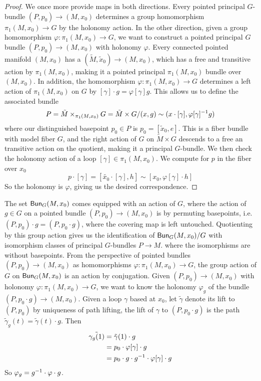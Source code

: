 %
\begin{proof}
 We once more provide maps in both directions. Every pointed principal $G$-bundle
 $(P,p_0) \to (M, x_0)$ determines a group homomorphism $\pi_1(M,x_0) \to G$
 by the holonomy action. In the other direction, given a group homomorphism
 $\varphi : \pi_1(M, x_0) \to G$, we want to construct a pointed principal $G$
 bundle $(P, p_0) \to (M, x_0)$ with holonomy $\varphi$. Every connected pointed manifold
 $(M, x_0)$ has a  $(\tilde{M}, \tilde{x}_0) \to (M,x_0)$,
 which has a free and transitive action by $\pi_1(M,x_0)$, making it a pointed
 principal $\pi_1(M,x_0)$ bundle over $(M,x_0)$. In addition, the homomorphism
 $\varphi : \pi_1(M, x_0) \to G$ determines a left action of $\pi_1(M,x_0)$
 on $G$ by $[\gamma] \cdot g = \varphi[\gamma] g$. This allows us to define
 the associated bundle
 \[
  P = \tilde{M} \times_{\pi_1(M, x_0)} G = \tilde{M} \times G
  / (x,g) \sim (x \cdot [\gamma], \varphi[\gamma]^{-1} g)
 \]
 where our distinguished basepoint $p_0 \in P$ is $p_0 = [\tilde{x}_0, e]$.
 This is a fiber bundle with model fiber $G$, and the right action of $G$
 on $\tilde{M} \times G$ descends to a free an transitive action on the quotient,
 making it a principal $G$-bundle. We then check the holonomy action of a
 loop $[\gamma] \in \pi_1(M, x_0)$. We compute for $p$ in the fiber over $x_0$
 \[
  p \cdot [\gamma] = [\tilde{x_0} \cdot [\gamma], h] \sim [x_0, \varphi[\gamma]\cdot h]
 \]
 So the holonomy is $\varphi$, giving us the desired correspondence.
\end{proof}
%
The set $\mathsf{Bun}_G(M, x_0)$ comes equipped with an action of $G$, where the action
of $g \in G$ on a pointed bundle $(P, p_0) \to (M, x_0)$  is by permuting basepoints,
i.e. $(P, p_0) \cdot g = (P, p_0 \cdot g)$, where the covering map is left untouched.
Quotienting by this group action gives us the identification of $\mathsf{Bun}_G(M,x_0) / G$
with isomorphism classes of principal $G$-bundles $P \to M$. where the
isomorphisms are without basepoints. From the perspective of pointed bundles
$(P,p_0) \to (M, x_0)$ as homomorphisms $\varphi : \pi_1(M, x_0) \to G$,
the group action of $G$ on $\mathsf{Bun}_G(M,x_0)$ is an action by conjugation.
Given $(P, p_0) \to (M, x_0)$ with holonomy $\varphi : \pi_1(M, x_0) \to G$,
we want to know the holonomy $\varphi_g$ of the bundle
$(P, p_0 \cdot g) \to (M, x_0)$. Given a loop $\gamma$ based at $x_0$, let
$\tilde{\gamma}$ denote its lift to $(P, p_0)$ by uniqueness of path lifting,
the lift of $\gamma$ to $(P, p_0 \cdot g)$ is the path
$\tilde{\gamma}_g(t) = \tilde{\gamma}(t) \cdot g$. Then
%
\begin{align*}
 \tilde{\gamma_g(1)} & = \tilde{\gamma}(1) \cdot g                             \\
                     & = p_0 \cdot \varphi[\gamma] \cdot g                     \\
                     & = p_0 \cdot g \cdot g^{-1} \cdot \varphi[\gamma] \cdot g
\end{align*}
%
So $\varphi_g = g ^{-1}\cdot\varphi\cdot g$.
%
